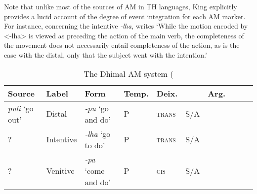 \documentclass[oneside,a4paper,11pt]{article}
\newcommand{\ipa}[1]{{\phon\textit{#1}}}
\newcommand{\Y}{\Checkmark}
\newcommand{\N}{\XSolidBrush}
\newcommand{\rouge}[1]{\textbf{#1}}
\begin{document}
Note that unlike most of the sources of AM in TH languages, King explicitly provides a lucid account of the degree of event integration for each AM marker. For instance, concerning the intentive \ipa{-lha}, \citet[177]{king09dhimal} writes `While the motion encoded by <-lha> is viewed as preceding the action of the main verb, the completeness of the movement does not necessarily entail completeness of the action, as is the case with the distal, only that the subject went with the intention.'

\begin{table}
\caption{The Dhimal AM system (\citet[173-188]{king09dhimal}} \label{tab:dhimal.am} \centering
\begin{tabular}{llllllllll}
\toprule
Source & Label &Form &Temp.& Deix. & & Arg. \\
\midrule
\ipa{puli} `go out' & Distal &	\ipa{-pu} `go and do' &	P &	\textsc{trans}&	S/A & \Y \\
? & Intentive &	\ipa{-lha} `go to do' &	P &	\textsc{trans}&	S/A & \N \\
? & Venitive &	\ipa{-pa} `come and do' &	P &	\textsc{cis}&	S/A & \Y \\
\bottomrule
\end{tabular}
\end{table}		

%
%
%
 
\end{document}
